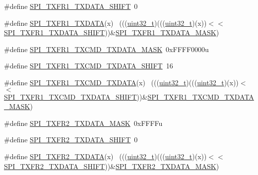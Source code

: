 \begin{DoxyCompactItemize}
\#define \hyperlink{group___s_p_i___register___masks_ga15dd2d0a8568bc36fed73be8a4cb24a0}{S\+P\+I\+\_\+\+T\+X\+F\+R1\+\_\+\+T\+X\+D\+A\+T\+A\+\_\+\+S\+H\+I\+FT}~0
\item 
\#define \hyperlink{group___s_p_i___register___masks_gabd7e322bf2ad97cf8ec496b73050be6c}{S\+P\+I\+\_\+\+T\+X\+F\+R1\+\_\+\+T\+X\+D\+A\+TA}(x)                                        ~(((\hyperlink{_p_e___types_8h_a33594304e786b158f3fb30289278f5af}{uint32\+\_\+t})(((\hyperlink{_p_e___types_8h_a33594304e786b158f3fb30289278f5af}{uint32\+\_\+t})(x))$<$$<$\hyperlink{group___s_p_i___register___masks_ga15dd2d0a8568bc36fed73be8a4cb24a0}{S\+P\+I\+\_\+\+T\+X\+F\+R1\+\_\+\+T\+X\+D\+A\+T\+A\+\_\+\+S\+H\+I\+FT}))\&\hyperlink{group___s_p_i___register___masks_ga1264b5c9bd3d50782925741457405b2d}{S\+P\+I\+\_\+\+T\+X\+F\+R1\+\_\+\+T\+X\+D\+A\+T\+A\+\_\+\+M\+A\+SK})
\item 
\#define \hyperlink{group___s_p_i___register___masks_ga03437d9c36165cd76cc1b649bc61fdcd}{S\+P\+I\+\_\+\+T\+X\+F\+R1\+\_\+\+T\+X\+C\+M\+D\+\_\+\+T\+X\+D\+A\+T\+A\+\_\+\+M\+A\+SK}~0x\+F\+F\+F\+F0000u
\item 
\#define \hyperlink{group___s_p_i___register___masks_ga0240ff4345642a5bca2308c670c5a980}{S\+P\+I\+\_\+\+T\+X\+F\+R1\+\_\+\+T\+X\+C\+M\+D\+\_\+\+T\+X\+D\+A\+T\+A\+\_\+\+S\+H\+I\+FT}~16
\item 
\#define \hyperlink{group___s_p_i___register___masks_gae977c9ab89b38c8398b28ab6fff430a9}{S\+P\+I\+\_\+\+T\+X\+F\+R1\+\_\+\+T\+X\+C\+M\+D\+\_\+\+T\+X\+D\+A\+TA}(x)                            ~(((\hyperlink{_p_e___types_8h_a33594304e786b158f3fb30289278f5af}{uint32\+\_\+t})(((\hyperlink{_p_e___types_8h_a33594304e786b158f3fb30289278f5af}{uint32\+\_\+t})(x))$<$$<$\hyperlink{group___s_p_i___register___masks_ga0240ff4345642a5bca2308c670c5a980}{S\+P\+I\+\_\+\+T\+X\+F\+R1\+\_\+\+T\+X\+C\+M\+D\+\_\+\+T\+X\+D\+A\+T\+A\+\_\+\+S\+H\+I\+FT}))\&\hyperlink{group___s_p_i___register___masks_ga03437d9c36165cd76cc1b649bc61fdcd}{S\+P\+I\+\_\+\+T\+X\+F\+R1\+\_\+\+T\+X\+C\+M\+D\+\_\+\+T\+X\+D\+A\+T\+A\+\_\+\+M\+A\+SK})
\item 
\#define \hyperlink{group___s_p_i___register___masks_ga5af82cbc997e329e1c914390f4a46ddf}{S\+P\+I\+\_\+\+T\+X\+F\+R2\+\_\+\+T\+X\+D\+A\+T\+A\+\_\+\+M\+A\+SK}~0x\+F\+F\+F\+Fu
\item 
\#define \hyperlink{group___s_p_i___register___masks_ga563b2a2513ee7f9ba76d56405bfaa053}{S\+P\+I\+\_\+\+T\+X\+F\+R2\+\_\+\+T\+X\+D\+A\+T\+A\+\_\+\+S\+H\+I\+FT}~0
\item 
\#define \hyperlink{group___s_p_i___register___masks_gada18fb71f3676817423d036206da6b40}{S\+P\+I\+\_\+\+T\+X\+F\+R2\+\_\+\+T\+X\+D\+A\+TA}(x)                                        ~(((\hyperlink{_p_e___types_8h_a33594304e786b158f3fb30289278f5af}{uint32\+\_\+t})(((\hyperlink{_p_e___types_8h_a33594304e786b158f3fb30289278f5af}{uint32\+\_\+t})(x))$<$$<$\hyperlink{group___s_p_i___register___masks_ga563b2a2513ee7f9ba76d56405bfaa053}{S\+P\+I\+\_\+\+T\+X\+F\+R2\+\_\+\+T\+X\+D\+A\+T\+A\+\_\+\+S\+H\+I\+FT}))\&\hyperlink{group___s_p_i___register___masks_ga5af82cbc997e329e1c914390f4a46ddf}{S\+P\+I\+\_\+\+T\+X\+F\+R2\+\_\+\+T\+X\+D\+A\+T\+A\+\_\+\+M\+A\+SK})
$$
\end{DoxyCompactItemize}
